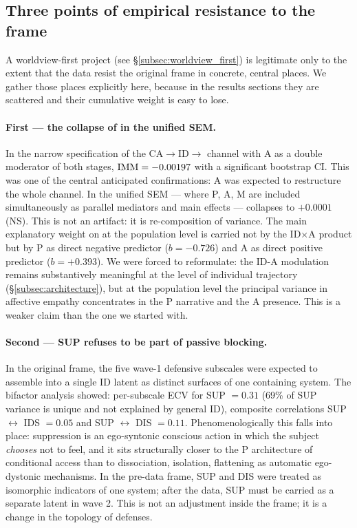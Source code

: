 \subsection{Three points of empirical resistance to the frame}
\label{subsec:data_resistance_en}

A worldview-first project (see §\ref{subsec:worldview_first}) is legitimate only to the extent that the data resist the original frame in concrete, central places. We gather those places explicitly here, because in the results sections they are scattered and their cumulative weight is easy to lose.

\paragraph{First --- the collapse of \IMM{} in the unified SEM.} In the narrow specification of the CA$\to$ID$\to$\EAF{} channel with A as a double moderator of both stages, $\mathrm{IMM} = -0.00197$ with a significant bootstrap CI. This was one of the central anticipated confirmations: A was expected to restructure the whole channel. In the unified SEM --- where P, A, M are included simultaneously as parallel mediators and main effects --- \IMM{} collapses to $+0.0001$ (NS). This is not an artifact: it is re-composition of variance. The main explanatory weight on \EAF{} at the population level is carried not by the ID$\times$A product but by P as direct negative predictor ($b = -0.726$) and A as direct positive predictor ($b = +0.393$). We were forced to reformulate: the ID-A modulation remains substantively meaningful at the level of individual trajectory (§\ref{subsec:architecture}), but at the population level the principal variance in affective empathy concentrates in the P narrative and the A presence. This is a weaker claim than the one we started with.

\paragraph{Second --- SUP refuses to be part of passive blocking.} In the original frame, the five wave-1 defensive subscales were expected to assemble into a single ID latent as distinct surfaces of one containing system. The bifactor analysis showed: per-subscale ECV for SUP $= 0.31$ (69\% of SUP variance is unique and not explained by general ID), composite correlations SUP $\leftrightarrow$ IDS $= 0.05$ and SUP $\leftrightarrow$ DIS $= 0.11$. Phenomenologically this falls into place: suppression is an ego-syntonic conscious action in which the subject \emph{chooses} not to feel, and it sits structurally closer to the P architecture of conditional access than to dissociation, isolation, flattening as automatic ego-dystonic mechanisms. In the pre-data frame, SUP and DIS were treated as isomorphic indicators of one system; after the data, SUP must be carried as a separate latent in wave 2. This is not an adjustment inside the frame; it is a change in the topology of defenses.

